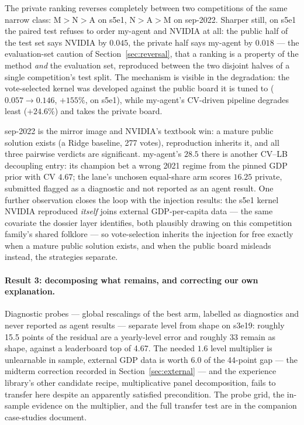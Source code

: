 \documentclass[11pt,a4paper]{article}
\newcommand{\M}{M}   %
\newcommand{\N}{N}   %
\newcommand{\A}{A}   %
\begin{document}
The private ranking reverses completely between two competitions of the same narrow class:
\M{}${>}$\N{}${>}$\A{} on s5e1, \N{}${>}$\A{}${>}$\M{} on sep-2022. Sharper still, on s5e1
the paired test refuses to order my-agent and NVIDIA at all: the public half of the test set
says NVIDIA by $0.045$, the private half says my-agent by $0.018$ --- the
evaluation-set caution of Section~\ref{sec:reversal}, that a ranking is a property of the
method \emph{and} the evaluation set, reproduced between the two disjoint halves of a single
competition's test split. The mechanism is
visible in the degradation: the vote-selected kernel was developed against the public board
it is tuned to ($0.057 \to 0.146$, $+155\%$, on s5e1), while my-agent's CV-driven pipeline
degrades least ($+24.6\%$) and takes the private board.

sep-2022 is the mirror image and NVIDIA's textbook win: a mature public solution exists (a
Ridge baseline, 277 votes), reproduction inherits it, and all three pairwise verdicts are
significant. my-agent's $28.5$ there is another CV--LB decoupling entry: its champion bet a
wrong 2021 regime from the pinned GDP prior with CV $4.67$; the lane's unchosen equal-share
arm scores $16.25$ private, submitted flagged as a diagnostic and not reported as an agent
result. One further observation closes the loop with the injection results: the s5e1 kernel
NVIDIA reproduced \emph{itself} joins external GDP-per-capita data --- the same covariate the
dossier layer identifies, both plausibly drawing on this competition family's shared folklore
--- so vote-selection
inherits the injection for free exactly when a mature public solution exists, and when the
public board misleads instead, the strategies separate.

\paragraph{Result 3: decomposing what remains, and correcting our own explanation.} Diagnostic probes --- global rescalings of the best arm, labelled as diagnostics and never reported as agent results --- separate level from shape on s3e19: roughly 15.5 points of the residual are a yearly-level error and roughly 33 remain as shape, against a leaderboard top of 4.67. The needed $1.6$ level multiplier is unlearnable in sample, external GDP data is worth $6.0$ of the 44-point gap --- the midterm correction recorded in Section~\ref{sec:external} --- and the experience library's other candidate recipe, multiplicative panel decomposition, fails to transfer here despite an apparently satisfied precondition. The probe grid, the in-sample evidence on the multiplier, and the full transfer test are in the companion case-studies document.
\end{document}
